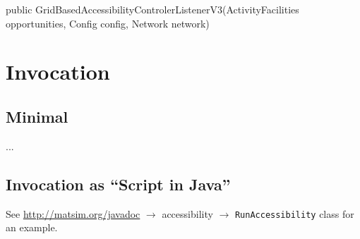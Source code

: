 public GridBasedAccessibilityControlerListenerV3(ActivityFacilities opportunities, Config config, Network network)

\section{Invocation}

\subsection{Minimal}

...



\subsection{Invocation as ``Script in Java''}

See \url{http://matsim.org/javadoc} $\to$ accessibility $\to$ \lstinline{RunAccessibility} class for an example.




